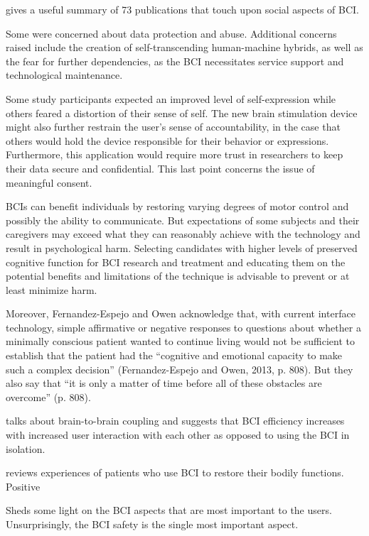 \documentclass[fleqn,11pt]{olplainarticle}
\begin{document}
\cite{kogel2019using} gives a useful summary of 73 publications that touch upon social aspects of BCI.

Some were concerned about data protection and abuse. Additional concerns raised include the creation of self-transcending human-machine hybrids, as well as the fear for further dependencies, as the BCI necessitates service support and technological maintenance.\cite{kogel2019using} 

Some study participants expected an improved level of self-expression while others feared a distortion of their sense of self. The new brain stimulation device might also further restrain the user’s sense of accountability, in the case that others would hold the device responsible for their behavior or expressions. Furthermore, this application would require more trust in researchers to keep their data secure and confidential. This last point concerns the issue of meaningful consent.\cite{kogel2019using} 

BCIs can benefit individuals by restoring varying degrees of motor control and possibly the ability to communicate. But expectations of some subjects and their caregivers may exceed what they can reasonably achieve with the technology and result in psychological harm. Selecting candidates with higher levels of preserved cognitive function for BCI research and treatment and educating them on the potential benefits and limitations of the technique is advisable to prevent or at least minimize harm.\cite{glannon2014ethical}

Moreover, Fernandez-Espejo and Owen acknowledge that, with current interface technology, simple affirmative or negative responses to questions about whether a minimally conscious patient wanted to continue living would not be sufficient to establish that the patient had the “cognitive and emotional capacity to make such a complex decision” (Fernandez-Espejo and Owen, 2013, p. 808). But they also say that “it is only a matter of time before all of these obstacles are overcome” (p. 808).\cite{glannon2014ethical}

\cite{sexton2015overlooked} talks about brain-to-brain coupling and suggests that BCI efficiency increases with increased user interaction with each other as opposed to using the BCI in isolation.

\cite{kogel2020like} reviews experiences of patients who use BCI to restore their bodily functions. Positive

\cite{kawala2021summary} Sheds some light on the BCI aspects that are most important to the users. Unsurprisingly, the BCI safety is the single most important aspect.
\end{document}
